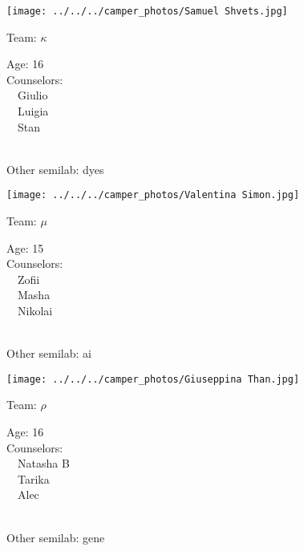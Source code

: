 \documentclass[10pt,letterpaper, landscape]{article}
\begin{document}
\verticalshiftfornextsticker
\renewcommand{\baselinestretch}{1} \begin{sticker}
\noindent\begin{minipage}{0.5\textwidth}\texttt{[image: ../../../camper\_photos/Samuel Shvets.jpg]}\end{minipage}\begin{minipage}{0.45\textwidth}
Team: {\Large $\kappa$}

Age:        16\\
Counselors: \\\ \ Giulio\\\ \ Luigia\\\ \ Stan\\
\end{minipage} \\ \vspace{0.07in}
Other semilab: dyes
\end{sticker}
\horizontalshiftfornextsticker
\renewcommand{\baselinestretch}{1} \begin{sticker}
\noindent\begin{minipage}{0.5\textwidth}\texttt{[image: ../../../camper\_photos/Valentina Simon.jpg]}\end{minipage}\begin{minipage}{0.45\textwidth}
Team: {\Large $\mu$}

Age:        15\\
Counselors: \\\ \ Zofii\\\ \ Masha\\\ \ Nikolai\\
\end{minipage} \\ \vspace{0.07in}
Other semilab: ai
\end{sticker}
\horizontalshiftfornextsticker
\renewcommand{\baselinestretch}{1} \begin{sticker}
\noindent\begin{minipage}{0.5\textwidth}\texttt{[image: ../../../camper\_photos/Giuseppina Than.jpg]}\end{minipage}\begin{minipage}{0.45\textwidth}
Team: {\Large $\rho$}

Age:        16\\
Counselors: \\\ \ Natasha B\\\ \ Tarika\\\ \ Alec\\
\end{minipage} \\ \vspace{0.07in}
Other semilab: gene
\end{sticker}
\end{document}
